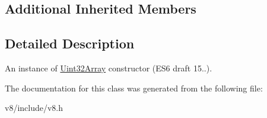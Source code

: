 \subsection*{Additional Inherited Members}


\subsection{Detailed Description}
An instance of \mbox{\hyperlink{classv8_1_1Uint32Array}{Uint32\+Array}} constructor (E\+S6 draft 15..). 

The documentation for this class was generated from the following file\+:\begin{DoxyCompactItemize}
\item 
v8/include/v8.\+h\end{DoxyCompactItemize}
